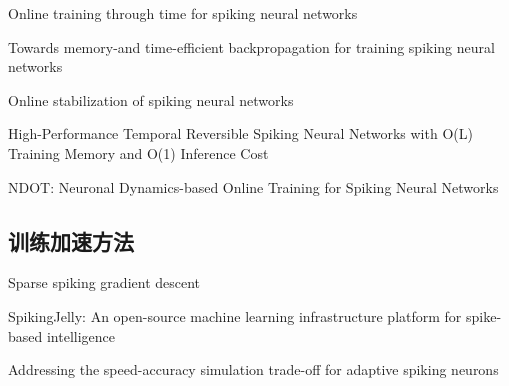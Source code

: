 \documentclass{SCIS2020cn}
\begin{document}
Online training through time for spiking neural networks

Towards memory-and time-efficient backpropagation for training spiking neural networks

Online stabilization of spiking neural networks

High-Performance Temporal Reversible Spiking Neural Networks with O(L) Training Memory and O(1) Inference Cost

NDOT: Neuronal Dynamics-based Online Training for Spiking Neural Networks


\subsection{训练加速方法}
Sparse spiking gradient descent

SpikingJelly: An open-source machine learning infrastructure platform for spike-based intelligence

Addressing the speed-accuracy simulation trade-off for adaptive spiking neurons










\makeentitle
\end{document}
